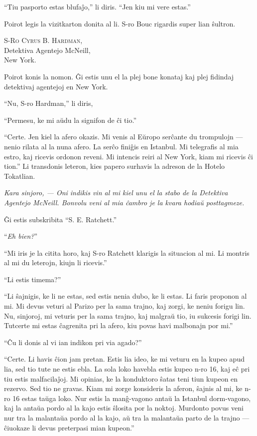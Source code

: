 ``Tiu pasporto estas blufaĵo,'' li diris. ``Jen kiu mi vere estas.''

Poirot legis la vizitkarton donita al li. S-ro Bouc rigardis super lian ŝultron.

\begin{center}{\textsc{S-Ro Cyrus B. Hardman,} \\
Detektiva Agentejo McNeill,\\
New York.\\}\end{center}

Poirot konis la nomon. Ĝi estis unu el la plej bone konataj kaj plej fidindaj detektivaj agentejoj en New York.

``Nu, S-ro Hardman,'' li diris,

``Permesu, ke mi aŭdu la signifon de ĉi tio.''

``Certe. Jen kiel la afero okazis. Mi venis al Eŭropo serĉante du trompulojn --- nenio rilata al la nuna afero. La serĉo finiĝis en Istanbul. Mi telegrafis al mia estro, kaj ricevis ordonon reveni. Mi intencis reiri al New York, kiam mi ricevis ĉi tion.'' Li transdonis leteron, kies papero surhavis la adreson de la Hotelo Tokatlian.

\begin{center}\itshape Kara sinjoro, --- Oni indikis vin al mi kiel unu el la stabo de la Detektiva Agentejo McNeill. Bonvolu veni al mia ĉambro je la kvara hodiaŭ posttagmeze.\end{center}

Ĝi estis subskribita ``S. E. Ratchett.''

``\emph{Eh bien?}''

``Mi iris je la citita horo, kaj S-ro Ratchett klarigis la situacion al mi. Li montris al mi du leterojn, kiujn li ricevis.''

``Li estis timema?''

``Li ŝajnigis, ke li ne estas, sed estis nenia dubo, ke li estas. Li faris proponon al mi. Mi devus veturi al Parizo per la sama trajno, kaj zorgi, ke neniu forigu lin. Nu, sinjoroj, mi veturis per la sama trajno, kaj malgraŭ tio, iu sukcesis forigi lin. Tutcerte mi estas ĉagrenita pri la afero, kiu povas havi malbonajn por mi.''

``Ĉu li donis al vi ian indikon pri via agado?''

``Certe. Li havis ĉion jam pretan. Estis lia ideo, ke mi veturu en la kupeo apud lia, sed tio tute ne estis ebla. La sola loko havebla estis kupeo n-ro 16, kaj eĉ pri tiu estis malfacilaĵoj. Mi opinias, ke la konduktoro ŝatas teni tiun kupeon en rezervo. Sed tio ne gravas. Kiam mi zorge konsideris la aferon, ŝajnis al mi, ke n-ro 16 estas taŭga loko. Nur estis la manĝ-vagono antaŭ la Istanbul dorm-vagono, kaj la antaŭa pordo al la kajo estis ŝlosita por la noktoj. Murdonto povus veni nur tra la malantaŭa pordo al la kajo, aŭ tra la malantaŭa parto de la trajno --- ĉiuokaze li devus preterpasi mian kupeon.''

